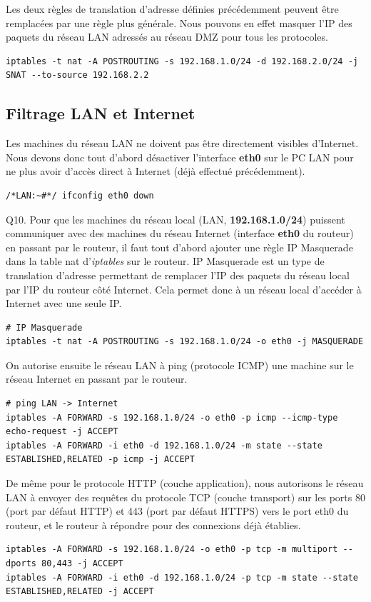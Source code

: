 \documentclass[frenchb, 11pt]{article}
\newlength{\leftbarwidth}
\newlength{\leftbarsep}
\newcommand*{\leftbarcolorcmd}{\color{leftbarcolor}} %
\renewenvironment{leftbar}{%
    \def\FrameCommand{{\leftbarcolorcmd{\vrule width \leftbarwidth\relax\hspace {\leftbarsep}}}}%
    \MakeFramed {\advance \hsize -\width \FrameRestore }%
}{%
    \endMakeFramed
}
\begin{document}
Les deux règles de translation d'adresse définies précédemment peuvent être remplacées par une règle plus générale. Nous pouvons en effet masquer l'IP des paquets du réseau LAN adressés au réseau DMZ pour tous les protocoles.
\begin{lstlisting}
iptables -t nat -A POSTROUTING -s 192.168.1.0/24 -d 192.168.2.0/24 -j SNAT --to-source 192.168.2.2
\end{lstlisting}

\subsection{Filtrage LAN et Internet}
Les machines du réseau LAN ne doivent pas être directement visibles d'Internet. Nous devons donc tout d'abord désactiver l'interface \textbf{eth0} sur le PC LAN pour ne plus avoir d'accès direct à Internet (déjà effectué précédemment).
\begin{lstlisting}
/*LAN:~#*/ ifconfig eth0 down
\end{lstlisting}

\begin{leftbar}
	\noindent Q10.
	Pour que les machines du réseau local (LAN, \textbf{192.168.1.0/24}) puissent communiquer avec des machines du réseau Internet (interface \textbf{eth0} du routeur) en passant par le routeur, il faut tout d'abord ajouter une règle IP Masquerade dans la table nat d'\emph{iptables} sur le routeur. IP Masquerade est un type de translation d'adresse permettant de remplacer l'IP des paquets du réseau local par l'IP du routeur côté Internet. Cela permet donc à un réseau local d'accéder à Internet avec une seule IP.
	\begin{lstlisting}[numbers=none]
# IP Masquerade
iptables -t nat -A POSTROUTING -s 192.168.1.0/24 -o eth0 -j MASQUERADE
	\end{lstlisting}
	On autorise ensuite le réseau LAN à ping (protocole ICMP) une machine sur le réseau Internet en passant par le routeur.
	\begin{lstlisting}[numbers=none]
# ping LAN -> Internet
iptables -A FORWARD -s 192.168.1.0/24 -o eth0 -p icmp --icmp-type echo-request -j ACCEPT
iptables -A FORWARD -i eth0 -d 192.168.1.0/24 -m state --state ESTABLISHED,RELATED -p icmp -j ACCEPT
	\end{lstlisting}
	De même pour le protocole HTTP (couche application), nous autorisons le réseau LAN à envoyer des requêtes du protocole TCP (couche transport) sur les ports 80 (port par défaut HTTP) et 443 (port par défaut HTTPS) vers le port eth0 du routeur, et le routeur à répondre pour des connexions déjà établies.
	\begin{lstlisting}[numbers=none]
iptables -A FORWARD -s 192.168.1.0/24 -o eth0 -p tcp -m multiport --dports 80,443 -j ACCEPT
iptables -A FORWARD -i eth0 -d 192.168.1.0/24 -p tcp -m state --state ESTABLISHED,RELATED -j ACCEPT
	\end{lstlisting}
\end{leftbar}
\end{document}
